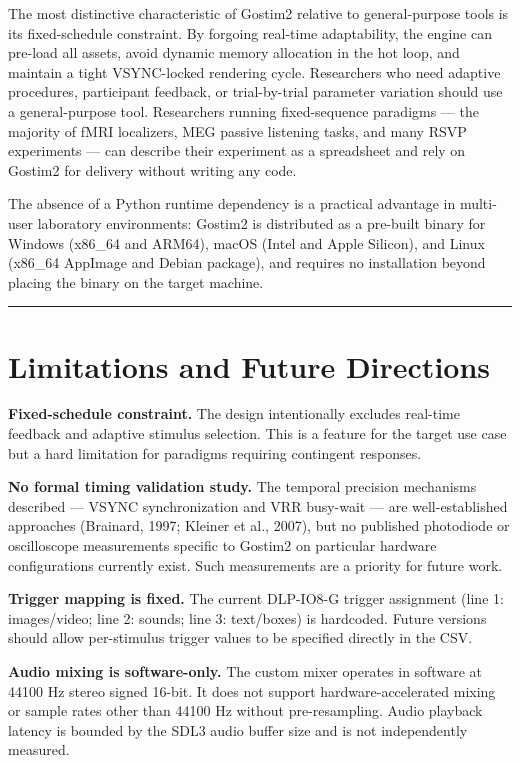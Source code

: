 \documentclass[
  11pt,
]{article}
\begin{document}
The most distinctive characteristic of Gostim2 relative to
general-purpose tools is its fixed-schedule constraint. By forgoing
real-time adaptability, the engine can pre-load all assets, avoid
dynamic memory allocation in the hot loop, and maintain a tight
VSYNC-locked rendering cycle. Researchers who need adaptive procedures,
participant feedback, or trial-by-trial parameter variation should use a
general-purpose tool. Researchers running fixed-sequence paradigms ---
the majority of fMRI localizers, MEG passive listening tasks, and many
RSVP experiments --- can describe their experiment as a spreadsheet and
rely on Gostim2 for delivery without writing any code.

The absence of a Python runtime dependency is a practical advantage in
multi-user laboratory environments: Gostim2 is distributed as a
pre-built binary for Windows (x86\_64 and ARM64), macOS (Intel and Apple
Silicon), and Linux (x86\_64 AppImage and Debian package), and requires
no installation beyond placing the binary on the target machine.

\begin{center}\rule{0.5\linewidth}{0.5pt}\end{center}

\section{Limitations and Future
Directions}\label{limitations-and-future-directions}

\textbf{Fixed-schedule constraint.} The design intentionally excludes
real-time feedback and adaptive stimulus selection. This is a feature
for the target use case but a hard limitation for paradigms requiring
contingent responses.

\textbf{No formal timing validation study.} The temporal precision
mechanisms described --- VSYNC synchronization and VRR busy-wait --- are
well-established approaches (Brainard, 1997; Kleiner et al., 2007), but
no published photodiode or oscilloscope measurements specific to Gostim2
on particular hardware configurations currently exist. Such measurements
are a priority for future work.

\textbf{Trigger mapping is fixed.} The current DLP-IO8-G trigger
assignment (line 1: images/video; line 2: sounds; line 3: text/boxes) is
hardcoded. Future versions should allow per-stimulus trigger values to
be specified directly in the CSV.

\textbf{Audio mixing is software-only.} The custom mixer operates in
software at 44100 Hz stereo signed 16-bit. It does not support
hardware-accelerated mixing or sample rates other than 44100 Hz without
pre-resampling. Audio playback latency is bounded by the SDL3 audio
buffer size and is not independently measured.
\end{document}
